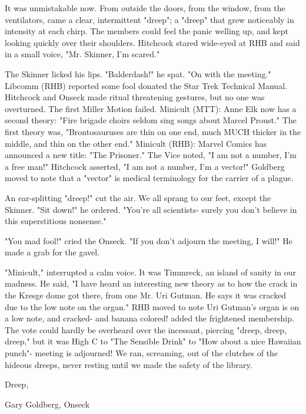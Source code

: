 \documentclass[12pt]{article}
\begin{document}
It was unmistakable now. From outside the doors, from the
window, from the ventilators, came a clear, intermittent "dreep"; a "dreep" that grew noticeably in intensity at each chirp. The members could feel the panic welling up, and kept looking quickly over their shoulders. Hitchcock stared wide-eyed at RHB and said in a small voice, "Mr. Skinner, I'm scared."

The Skinner licked his lips. "Balderdash!" he spat. "On with the meeting." Libcomm (RHB) reported some fool donated the Star Trek Technical Manual. Hitchcock and Onseck made ritual threatening gestures, but no one was overturned. The first Miller Motion failed. Minicult (MTT): Anne Elk now has a second theory: "Fire brigade choirs seldom sing songs about Marcel Proust." The first theory was, "Brontosauruses are thin on one end, much MUCH thicker in the middle, and thin on the other end." Minicult (RHB): Marvel Comics has announced a new title: "The Prisoner." The Vice noted, "I am not a number, I'm a free man!" Hitchcock asserted, "I am not a number, I'm a vector!" Goldberg moved to note that a "vector" is medical terminology for the carrier of a plague.

An ear-splitting "dreep!" cut the air. We all sprang to our feet, except the Skinner. "Sit down!" he ordered. "You're all scientists- surely you don't believe in this superstitious nonsense."

"You mad fool!" cried the Onseck. "If you don't adjourn the meeting, I will!" He made a grab for the gavel.

"Minicult," interrupted a calm voice. It was Timmreck, an island of sanity in our madness. He said, "I have heard an interesting new theory as to how the crack in the Kresge dome got there, from one Mr. Uri Gutman. He says it was cracked due to the low note on the organ." RHB moved to note Uri Gutman's organ is on a low note, and cracked- and banana colored! added the frightened membership. The vote could hardly be overheard over the incessant, piercing "dreep, dreep, dreep," but it was High C to "The Sensible Drink" to "How about a nice Hawaiian punch"- meeting is adjourned! We ran, screaming, out of the clutches of the hideous dreeps, never resting until we made the safety of the library.

\vspace{12pt}

\centerline{Dreep,}
\centerline{Gary Goldberg, Onseck}
\end{document}
